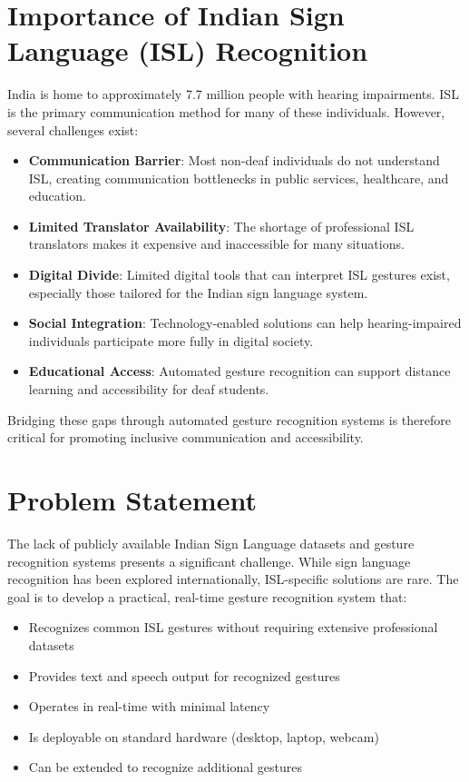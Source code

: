 \documentclass[12pt,a4paper]{report}
\begin{document}
\section{Importance of Indian Sign Language (ISL) Recognition}

India is home to approximately 7.7 million people with hearing impairments. ISL is the primary communication method for many of these individuals. However, several challenges exist:

\begin{itemize}
    \item \textbf{Communication Barrier}: Most non-deaf individuals do not understand ISL, creating communication bottlenecks in public services, healthcare, and education.
    \item \textbf{Limited Translator Availability}: The shortage of professional ISL translators makes it expensive and inaccessible for many situations.
    \item \textbf{Digital Divide}: Limited digital tools that can interpret ISL gestures exist, especially those tailored for the Indian sign language system.
    \item \textbf{Social Integration}: Technology-enabled solutions can help hearing-impaired individuals participate more fully in digital society.
    \item \textbf{Educational Access}: Automated gesture recognition can support distance learning and accessibility for deaf students.
\end{itemize}

Bridging these gaps through automated gesture recognition systems is therefore critical for promoting inclusive communication and accessibility.

\section{Problem Statement}

The lack of publicly available Indian Sign Language datasets and gesture recognition systems presents a significant challenge. While sign language recognition has been explored internationally, ISL-specific solutions are rare. The goal is to develop a practical, real-time gesture recognition system that:

\begin{itemize}
    \item Recognizes common ISL gestures without requiring extensive professional datasets
    \item Provides text and speech output for recognized gestures
    \item Operates in real-time with minimal latency
    \item Is deployable on standard hardware (desktop, laptop, webcam)
    \item Can be extended to recognize additional gestures
\end{itemize}
\end{document}
